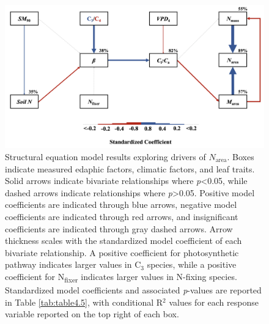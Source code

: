 \newpage
\begin{landscape}
    \begin{figure}
        \centering
        \includegraphics[scale = 0.35]{ch4_TXeco/figs/TXeco_fig5_SEM.png}
        \caption[Structural equation model results exploring drivers of $N_\mathrm{area}$]{Structural equation model results exploring drivers of $N_\mathrm{area}$. Boxes indicate measured edaphic factors, climatic factors, and leaf traits. Solid arrows indicate bivariate relationships where \textit{p}<0.05, while dashed arrows indicate relationships where \textit{p}>0.05. Positive model coefficients are indicated through blue arrows, negative model coefficients are indicated through red arrows, and insignificant coefficients are indicated through gray dashed arrows. Arrow thickness scales with the standardized model coefficient of each bivariate relationship. A positive coefficient for photosynthetic pathway indicates larger values in C$_3$ species, while a positive coefficient for N\textsubscript{fixer} indicates larger values in N-fixing species. Standardized model coefficients and associated \textit{p}-values are reported in Table \ref{tab:table4.5}, with conditional R$^2$ values for each response variable reported on the top right of each box.}
        \label{fig:figure4.5}
    \end{figure}
\end{landscape}
\clearpage

